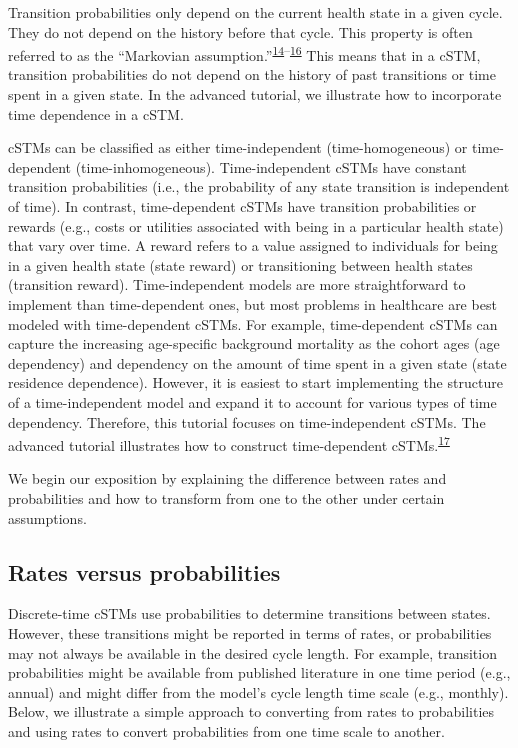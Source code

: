 \documentclass[
]{article}
\begin{document}
Transition probabilities only depend on the current health state in a given cycle. They do not depend on the history before that cycle. This property is often referred to as the ``Markovian assumption.''\textsuperscript{\protect\hyperlink{ref-Kuntz2001}{14}--\protect\hyperlink{ref-Beck1983}{16}} This means that in a cSTM, transition probabilities do not depend on the history of past transitions or time spent in a given state. In the advanced tutorial, we illustrate how to incorporate time dependence in a cSTM.

cSTMs can be classified as either time-independent (time-homogeneous) or time-dependent (time-inhomogeneous). Time-independent cSTMs have constant transition probabilities (i.e., the probability of any state transition is independent of time). In contrast, time-dependent cSTMs have transition probabilities or rewards (e.g., costs or utilities associated with being in a particular health state) that vary over time. A reward refers to a value assigned to individuals for being in a given health state (state reward) or transitioning between health states (transition reward). Time-independent models are more straightforward to implement than time-dependent ones, but most problems in healthcare are best modeled with time-dependent cSTMs. For example, time-dependent cSTMs can capture the increasing age-specific background mortality as the cohort ages (age dependency) and dependency on the amount of time spent in a given state (state residence dependence). However, it is easiest to start implementing the structure of a time-independent model and expand it to account for various types of time dependency. Therefore, this tutorial focuses on time-independent cSTMs. The advanced tutorial illustrates how to construct time-dependent cSTMs.\textsuperscript{\protect\hyperlink{ref-Alarid-Escudero2021b}{17}}

We begin our exposition by explaining the difference between rates and probabilities and how to transform from one to the other under certain assumptions.

\hypertarget{rates-versus-probabilities}{%
\subsection{Rates versus probabilities}\label{rates-versus-probabilities}}

Discrete-time cSTMs use probabilities to determine transitions between states. However, these transitions might be reported in terms of rates, or probabilities may not always be available in the desired cycle length. For example, transition probabilities might be available from published literature in one time period (e.g., annual) and might differ from the model's cycle length time scale (e.g., monthly). Below, we illustrate a simple approach to converting from rates to probabilities and using rates to convert probabilities from one time scale to another.
\end{document}

